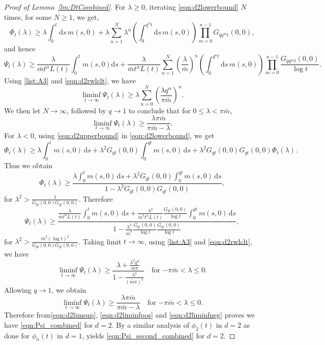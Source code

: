 \documentclass{article}[12pt]
\theoremstyle{definition}
\newcommand{\1}{\mathbbm{1}}
\newcommand{\dd }{\mathrm{d} }
\begin{document}
\begin{proof}[Proof of Lemma~\ref{lm:DtCombined}]
For $\lambda\ge 0$, iterating \eqref{eqn:d2lowerbound} $N$ times, for some $N\ge 1$, we get,
$$\Phi_t(\lambda) \ge \lambda \int_0^t\dd s\,m(s,0) +\lambda \sum_{n=1}^N \lambda^n\left(\int_0^{q^n t}\dd s\, m(s,0)\right)\prod_{m=0}^{n-1}G_{\bar{q}q^m t}(0,0),$$
and hence
$$\Psi_t(\lambda)\ge \frac{\lambda}{\bar{m}t^\alpha L(t)}\int_0^t m(s,0)\dd s + \frac{\lambda}{\bar{m}t^\alpha L(t)}\sum_{n=1}^N \left(\frac{\lambda}{\bar{m}}\right)^n\left(\int_0^{q^n t}\dd s\, m(s,0)\right)\prod_{m=0}^{n-1}\frac{G_{\bar{q}q^m t}(0,0)}{\log t}.$$
Using \ref{list:A3} and \eqref{eqn:d2rwlclt}, we have
$$\liminf_{t\to \infty}\Psi_t(\lambda) \ge \lambda \sum_{n=0}^N \left(\frac{\lambda q^\alpha}{\pi\bar{m}}\right)^n.$$
We then let $N\to \infty$, followed by $q\to 1$ to conclude that for $0\le \lambda < \pi \bar{m}$,
\begin{equation}
    \liminf_{t\to \infty}\Psi_t(\lambda)\ge  \frac{\lambda \pi \bar{m}}{\pi\bar{m} - \lambda}.
    \label{eqn:d2liminfpos}
\end{equation}
For $\lambda <0$, using \eqref{eqn:d2upperbound} in \eqref{eqn:d2lowerbound}, we get 
$$\Phi_t(\lambda) \ge \lambda\int_0^t m(s,0)\,\dd s + \lambda^2 G_{\bar{q}t}(0,0)\int_0^{qt}m(s,0)\,\dd s+ \lambda^2 G_{\bar{q}t}(0,0)G_{qt}(0,0)\Phi_t(\lambda).$$
Thus we obtain
$$\Phi_t(\lambda) \ge \frac{\lambda\int_0^t m(s,0)\,\dd s + \lambda^2 G_{\bar{q}t}(0,0)\int_0^{qt}m(s,0)\,\dd s}{1- \lambda^2 G_{\bar{q}t}(0,0)G_{qt}(0,0)},$$
for $\lambda^2 > \frac{1}{G_{\bar{q}t}(0,0)G_{qt}(0,0)}$. Therefore
$$\Psi_t(\lambda) \ge \frac{\frac{\lambda}{\bar{m}t^\alpha L(t)}\int_0^t m(s,0)\,\dd s + \frac{\lambda^2}{\bar{m}^2t^\alpha L(t)}\frac{ G_{\bar{q}t}(0,0)}{\log t}\int_0^{qt}m(s,0)\,\dd s}{1- \frac{\lambda^2}{\bar{m}^2} \frac{G_{\bar{q}t}(0,0)}{\log t}\frac{G_{qt}(0,0)}{\log t}},$$
for $\lambda^2 > \frac{\bar{m}^2(\log t)^2}{G_{\bar{q}t}(0,0)G_{qt}(0,0)}$. Taking limit $t\to \infty$, using \ref{list:A3} and \eqref{eqn:d2rwlclt}, we have
$$\liminf_{t\to \infty}\Psi_t(\lambda) \ge \frac{\lambda + \frac{\lambda^2 q^\alpha}{\bar{m}\pi}}{1-\frac{\lambda^2}{(\bar{m}\pi)^2}} \quad \text{for $-\pi \bar{m}< \lambda \le 0$}.$$
Allowing $q\to 1$, we obtain
\begin{equation}
    \liminf_{t\to \infty}\Psi_t(\lambda)\ge  \frac{\lambda \pi \bar{m}}{\pi\bar{m} - \lambda}\quad \text{for $-\pi \bar{m}< \lambda \le 0$}.
    \label{eqn:d2liminfneg}
\end{equation}
Therefore from\eqref{eqn:d2limsup}, \eqref{eqn:d2liminfpos}
and \eqref{eqn:d2liminfneg} proves we have \eqref{eqn:Psi_combined} for $d=2$. By a similar analysis of $\phi_2(t)$ in $d=2$ as done for $\phi_n(t)$ in $d=1$, yields \eqref{eqn:Psi_second_combined} for $d=2$.

\end{proof}
\end{document}
